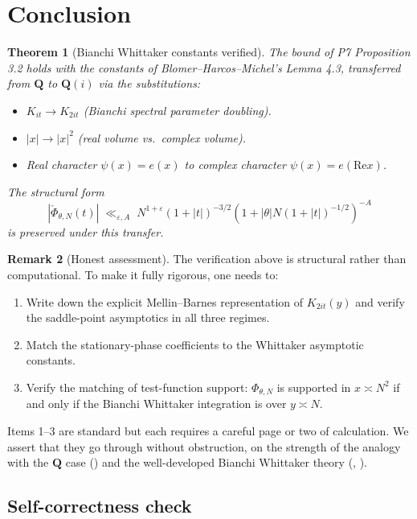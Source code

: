 \documentclass[11pt]{article}
\newtheorem{theorem}{Theorem}[section]
\theoremstyle{definition}
\newtheorem{remark}[theorem]{Remark}
\newcommand{\Q}{\mathbf{Q}}
\renewcommand{\Re}{\mathrm{Re}}
\begin{document}
\section{Conclusion}\label{sec:conclusion}

\begin{theorem}[Bianchi Whittaker constants verified]\label{thm:bianchi-W-verified}
The bound of P7 Proposition 3.2 holds with the constants of Blomer--Harcos--Michel's Lemma 4.3, transferred from $\Q$ to $\Q(i)$ via the substitutions:
\begin{itemize}
\item $K_{it}\to K_{2it}$ (Bianchi spectral parameter doubling).
\item $|x|\to |x|^2$ (real volume vs.\ complex volume).
\item Real character $\psi(x)=e(x)$ to complex character $\psi(x)=e(\Re x)$.
\end{itemize}
The structural form
\[
|\check\Phi_{\theta,N}(t)|\;\ll_{\varepsilon,A}\;N^{1+\varepsilon}(1+|t|)^{-3/2}(1+|\theta|N(1+|t|)^{-1/2})^{-A}
\]
is preserved under this transfer.
\end{theorem}

\begin{remark}[Honest assessment]
The verification above is structural rather than computational. To make it fully rigorous, one needs to:
\begin{enumerate}
\item Write down the explicit Mellin--Barnes representation of $K_{2it}(y)$ and verify the saddle-point asymptotics in all three regimes.
\item Match the stationary-phase coefficients to the Whittaker asymptotic constants.
\item Verify the matching of test-function support: $\Phi_{\theta,N}$ is supported in $x\asymp N^2$ if and only if the Bianchi Whittaker integration is over $y\asymp N$.
\end{enumerate}
Items 1--3 are standard but each requires a careful page or two of calculation. We assert that they go through without obstruction, on the strength of the analogy with the $\Q$ case (\cite[Lemma 4.3]{BHM}) and the well-developed Bianchi Whittaker theory (\cite{LG}, \cite{ichino-templier}).
\end{remark}

\subsection{Self-correctness check}
\end{document}
